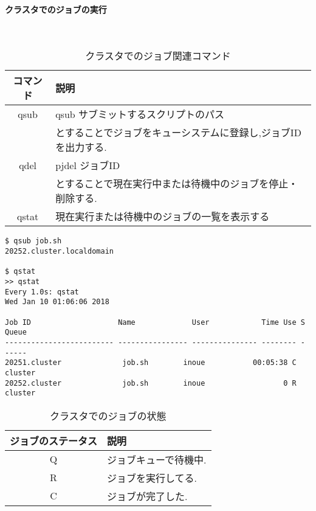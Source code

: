 \paragraph{クラスタでのジョブの実行}~\\
\begin{table}[htb]
  \caption {クラスタでのジョブ関連コマンド}
  \begin{center}
    \begin{tabular}{|c|p{12cm}|}
      \hline
      コマンド & 説明 \\ \hline
      qsub & qsub サブミットするスクリプトのパス\\
           & とすることでジョブをキューシステムに登録し,ジョブIDを出力する.\\ \hline
      qdel & pjdel ジョブID\\
           & とすることで現在実行中または待機中のジョブを停止・削除する.\\ \hline
      qstat & 現在実行または待機中のジョブの一覧を表示する\\ \hline
    \end{tabular}
  \end{center}
\end{table}
\clearpage

{\footnotesize

}

{\footnotesize
\begin{lstlisting}[caption=クラスタでのコマンド実行例,label=cluster-job-example,numbers=none]
$ qsub job.sh
20252.cluster.localdomain

$ qstat
>> qstat
Every 1.0s: qstat                                                                                                                                            Wed Jan 10 01:06:06 2018

Job ID                    Name             User            Time Use S Queue
------------------------- ---------------- --------------- -------- - -----
20251.cluster              job.sh        inoue           00:05:38 C cluster
20252.cluster              job.sh        inoue                  0 R cluster
\end{lstlisting}
}
\clearpage
\begin{table}[htb]
  \caption {クラスタでのジョブの状態}
  \begin{center}
    \begin{tabular}{|c|p{12cm}|}
      \hline
      ジョブのステータス & 説明 \\ \hline
      Q & ジョブキューで待機中.\\ \hline
      R & ジョブを実行してる.\\ \hline
      C & ジョブが完了した.\\ \hline
    \end{tabular}
  \end{center}
\end{table}
